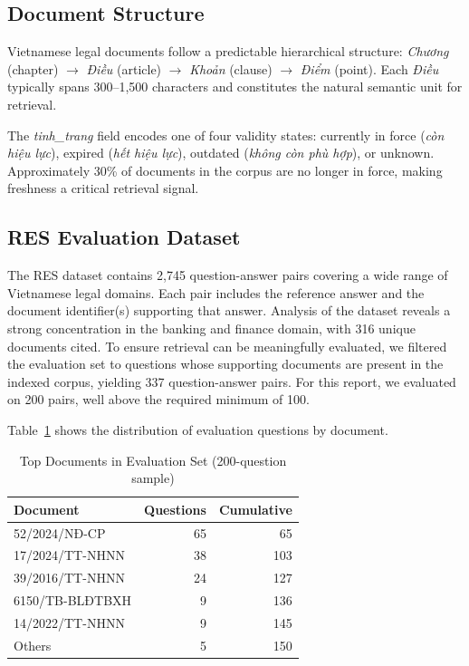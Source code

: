 \documentclass[conference]{IEEEtran}
\begin{document}
\subsection{Document Structure}

Vietnamese legal documents follow a predictable hierarchical structure:
\emph{Chương} (chapter) $\to$ \emph{Điều} (article) $\to$ \emph{Khoản}
(clause) $\to$ \emph{Điểm} (point). Each \emph{Điều} typically spans
300–1,500 characters and constitutes the natural semantic unit for retrieval.

The \emph{tinh\_trang} field encodes one of four validity states: currently
in force (\emph{còn hiệu lực}), expired (\emph{hết hiệu lực}), outdated
(\emph{không còn phù hợp}), or unknown. Approximately 30\% of documents
in the corpus are no longer in force, making freshness a critical retrieval
signal.

\subsection{RES Evaluation Dataset}

The RES dataset contains 2,745 question-answer pairs covering a wide range
of Vietnamese legal domains. Each pair includes the reference answer and the
document identifier(s) supporting that answer. Analysis of the dataset
reveals a strong concentration in the banking and finance domain, with
316 unique documents cited. To ensure retrieval can be meaningfully evaluated,
we filtered the evaluation set to questions whose supporting documents are
present in the indexed corpus, yielding 337 question-answer pairs.
For this report, we evaluated on 200 pairs, well above the required minimum
of 100.

Table~\ref{tab:res} shows the distribution of evaluation questions by
document.

\begin{table}[h]
\caption{Top Documents in Evaluation Set (200-question sample)}
\label{tab:res}
\centering
\begin{tabular}{lrr}
\toprule
\textbf{Document} & \textbf{Questions} & \textbf{Cumulative} \\
\midrule
52/2024/NĐ-CP    & 65  & 65  \\
17/2024/TT-NHNN  & 38  & 103 \\
39/2016/TT-NHNN  & 24  & 127 \\
6150/TB-BLĐTBXH  & 9   & 136 \\
14/2022/TT-NHNN  & 9   & 145 \\
Others           & 5   & 150 \\
\bottomrule
\end{tabular}
\end{table}
\end{document}

